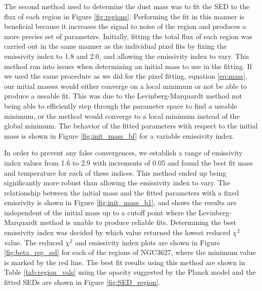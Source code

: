 The second method used to determine the dust mass was to fit the SED to the flux of each region in Figure \ref{fig:regions}.  Performing the fit in this manner is beneficial because it increases the signal to noise of the region and produces a more precise set of parameters.  Initially, fitting the total flux of each region was carried out in the same manner as the individual pixel fits by fixing the emissivity index to 1.8 and 2.0, and allowing the emissivity index to vary.  This method ran into issues when determining an initial mass to use in the fitting.  If we used the same procedure as we did for the pixel fitting, equation \ref{eq:mass}, our initial masses would either converge on a local minimum or not be able to produce a useable fit.  This was due to the Levinberg-Marquardt method not being able to efficiently step through the parameter space to find a useable minimum, or the method would converge to a local minimum instead of the global minimum.  The behavior of the fitted parameters with respect to the initial mass is shown in Figure \ref{fig:init_mass_bf} for a variable emissivity index.  

In order to prevent any false convergences, we establish a range of emissivity index values from 1.6 to 2.9 with increments of 0.05 and found the best fit mass and temperature for each of these indices.  This method ended up being significantly more robust than allowing the emissivity index to vary.  The relationship between the initial mass and the fitted parameters with a fixed emissivity is shown in Figure \ref{fig:init_mass_b1}, and shows the results are independent of the initial mass up to a cutoff point where the Levinberg-Marquardt method is unable to produce reliable fits.  Determining the best emissivity index was decided by which value returned the lowest reduced $\chi^2$ value.  The reduced $\chi^2$ and emissivity index plots are shown in Figure \ref{fig:beta_reg_sel} for each of the regions of NGC3627, where the minimum value is marked by the red line.  The best fit results using this method are shown in Table \ref{tab:region_vals} using the opacity suggested by the Planck model and the fitted SEDs are shown in Figure \ref{fig:SED_region}.

